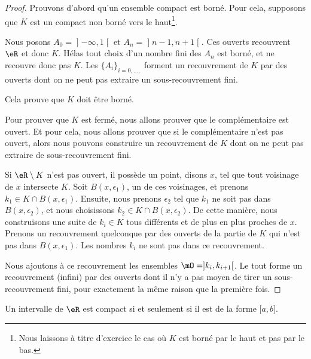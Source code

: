 \begin{proof}
	Prouvons d'abord qu'un ensemble compact est borné. Pour cela, supposons que \( K\) est un compact non borné vers le haut\footnote{Nous laissons à titre d'exercice le cas où \( K\) est borné par le haut et pas par le bas.}.

	Nous posons \( A_0=\mathopen] -\infty , 1 \mathclose[\) et \( A_n=\mathopen] n-1 , n+1 \mathclose[\). Ces ouverts recouvrent \( \eR\) et donc \( K\). Hélas tout choix d'un nombre fini des \( A_n\) est borné, et ne recouvre donc pas \( K\). Les \(  \{ A_i \}_{i=0,\ldots, }  \) forment un recouvrement de \( K\) par des ouverts dont on ne peut pas extraire un sous-recouvrement fini.

		Cela prouve que \( K\) doit être borné.

		Pour prouver que \( K\) est fermé, nous allons prouver que le complémentaire est ouvert. Et pour cela, nous allons prouver que si le complémentaire n'est pas ouvert, alors nous pouvons construire un recouvrement de \( K\) dont on ne peut pas extraire de sous-recouvrement fini.

		Si \( \eR\setminus K\) n'est pas ouvert, il possède un point, disons \( x\), tel que tout voisinage de \( x\) intersecte \( K\). Soit \( B(x,\epsilon_1)\), un de ces voisinages, et prenons \( k_1\in K\cap B(x,\epsilon_1)\). Ensuite, nous prenons \( \epsilon_2\) tel que \( k_1\) ne soit pas dans \( B(x,\epsilon_2)\), et nous choisissons \( k_2\in K\cap B(x,\epsilon_2)\). De cette manière, nous construisons une suite de \( k_i\in K\) tous différents et de plus en plus proches de \( x\). Prenons un recouvrement quelconque par des ouverts de la partie de \( K\) qui n'est pas dans \( B(x,\epsilon_1)\). Les nombres \( k_i\) ne sont pas dans ce recouvrement.

		Nous ajoutons à ce recouvrement les ensembles \( \mO=]k_i,k_{i+1}[\). Le tout forme un recouvrement (infini) par des ouverts dont il n'y a pas moyen de tirer un sous-recouvrement fini, pour exactement la même raison que la première fois.
\end{proof}

\begin{theorem}   \label{ThoBOrelLebesgue}
	Un intervalle de \( \eR\) est compact si et seulement si il est de la forme \( \mathopen[ a , b \mathclose]\).
\end{theorem}

